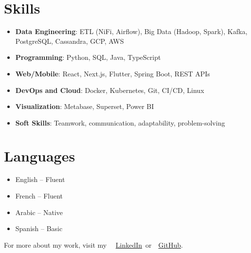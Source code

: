 \documentclass[10pt,a4paper,sans]{moderncv}
\begin{document}
\section{\fontsize{11}{12.1}\selectfont Skills}
\vspace{-6pt}
\begin{itemize}[leftmargin=0.3cm, itemsep=-2pt, topsep=0pt, partopsep=0pt, parsep=0pt]
  \item \textbf{Data Engineering}: ETL (NiFi, Airflow), Big Data (Hadoop, Spark), Kafka, PostgreSQL, Cassandra, GCP, AWS
  \item \textbf{Programming}: Python, SQL, Java, TypeScript
  \item \textbf{Web/Mobile}: React, Next.js, Flutter, Spring Boot, REST APIs
  \item \textbf{DevOps and Cloud}: Docker, Kubernetes, Git, CI/CD, Linux
  \item \textbf{Visualization}: Metabase, Superset, Power BI
  \item \textbf{Soft Skills}: Teamwork, communication, adaptability, problem-solving
\end{itemize}

\vspace{-18pt}
\section{\fontsize{11}{12.1}\selectfont Languages}
\vspace{-17pt}
\begin{multicols}{2}
\begin{itemize}[leftmargin=0.3cm, itemsep=-2pt, topsep=0pt, partopsep=0pt, parsep=0pt]
    \item English – Fluent
    \item French – Fluent
    \item Arabic – Native
    \item Spanish – Basic
\end{itemize}
\end{multicols}

\vspace{-20pt}
\begin{center}
    {\fontsize{9}{11}\selectfont\color{gray}
    For more about my work, visit my~
    \faLinkedin~\href{https://www.linkedin.com/in/ahmed-makroum/}{LinkedIn}~or~\faGithub~\href{https://github.com/ahmedmakroum}{GitHub}.}
\end{center}
\end{document}
